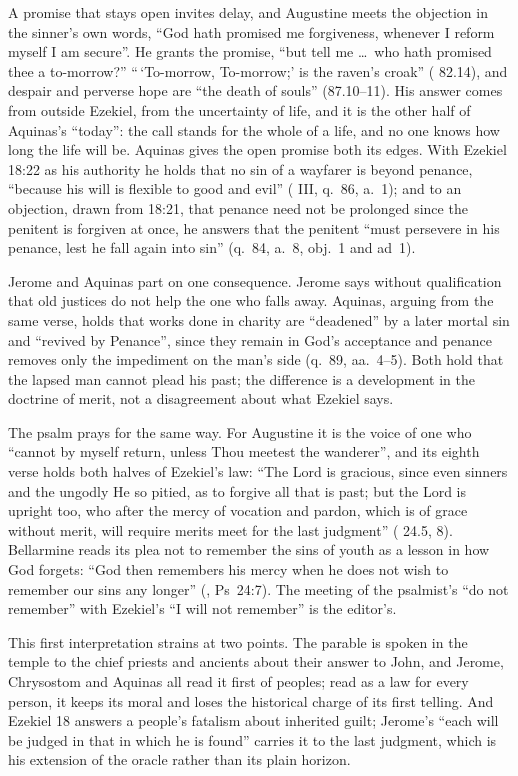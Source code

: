 A promise that stays open invites delay, and Augustine meets the objection in
the sinner's own words, ``God hath promised me forgiveness, whenever I reform
myself I am secure''. He grants the promise, ``but tell me \ldots\ who hath
promised thee a to-morrow?'' ``\,`To-morrow, To-morrow;' is the raven's croak''
( 82.14), and despair and perverse hope are ``the death of souls''
(87.10--11). His answer comes from outside Ezekiel, from the uncertainty of life,
and it is the other half of Aquinas's ``today'': the call stands for the whole
of a life, and no one knows how long the life will be. Aquinas gives the open
promise both its edges. With Ezekiel 18:22 as his authority he holds that no sin of a
wayfarer is beyond penance, ``because his will is flexible to good and evil''
( III, q.~86, a.~1); and to an objection, drawn from
18:21, that penance need not be prolonged since the penitent is forgiven at
once, he answers that the penitent ``must persevere in his penance, lest he
fall again into sin'' (q.~84, a.~8, obj.~1 and ad~1).

Jerome and Aquinas part on one consequence. Jerome says without qualification
that old justices do not help the one who falls away. Aquinas, arguing from the
same verse, holds that works done in charity are ``deadened'' by a later mortal
sin and ``revived by Penance'', since they remain in God's acceptance and
penance removes only the impediment on the man's side (q.~89, aa.~4--5). Both
hold that the lapsed man cannot plead his past; the difference is a
development in the doctrine of merit, not a disagreement about what Ezekiel
says.

The psalm prays for the same way. For Augustine it is the voice of one who
``cannot by myself return, unless Thou meetest the wanderer'', and its eighth
verse holds both halves of Ezekiel's law: ``The Lord is gracious, since even
sinners and the ungodly He so pitied, as to forgive all that is past; but the
Lord is upright too, who after the mercy of vocation and pardon, which is of
grace without merit, will require merits meet for the last judgment''
( 24.5, 8). Bellarmine reads its plea not to
remember the sins of youth as a lesson in how God forgets: ``God then remembers
his mercy when he does not wish to remember our sins any longer''
(, Ps~24:7). The meeting of the
psalmist's ``do not remember'' with Ezekiel's ``I will not remember'' is the
editor's.

This first interpretation strains at two points. The parable is spoken in the
temple to the chief priests and ancients about their answer to John, and
Jerome, Chrysostom and Aquinas all read it first of peoples; read as a law for
every person, it keeps its moral and loses the historical charge of its first
telling. And Ezekiel 18 answers a people's fatalism about inherited guilt;
Jerome's ``each will be judged in that in which he is found'' carries it to
the last judgment, which is his extension of the oracle rather than its plain
horizon.

